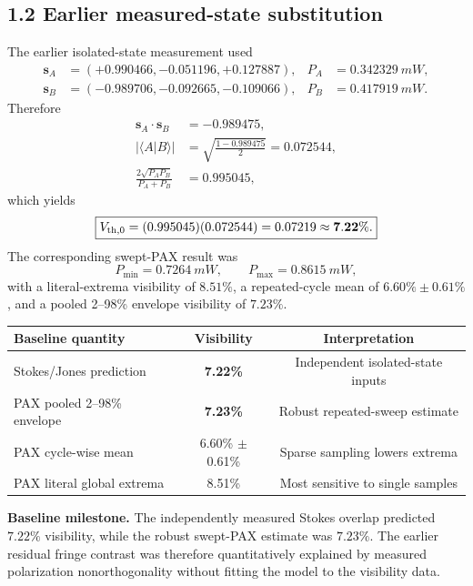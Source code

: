 \documentclass[10pt]{article}
\newcommand{\vect}[1]{\bm{#1}}
\begin{document}
\subsection*{1.2 Earlier measured-state substitution}
The earlier isolated-state measurement used
\begin{align*}
\vect{s}_A&=(+0.990466,-0.051196,+0.127887), & P_A&=\SI{0.342329}{mW},\\
\vect{s}_B&=(-0.989706,-0.092665,-0.109066), & P_B&=\SI{0.417919}{mW}.
\end{align*}
Therefore
\begin{align*}
\vect{s}_A\cdot\vect{s}_B&=-0.989475,\\
\left|\langle A\vert B\rangle\right|&=\sqrt{\frac{1-0.989475}{2}}=0.072544,\\
\frac{2\sqrt{P_AP_B}}{P_A+P_B}&=0.995045,
\end{align*}
which yields
\begin{equation}
\boxed{V_{\rm th,0}=(0.995045)(0.072544)=0.07219\approx\mathbf{7.22\%}.}
\end{equation}
The corresponding swept-PAX result was
\[
P_{\min}=\SI{0.7264}{mW},\qquad P_{\max}=\SI{0.8615}{mW},
\]
with a literal-extrema visibility of $8.51\%$, a repeated-cycle mean of $6.60\%\pm0.61\%$, and a pooled 2--98\% envelope visibility of $7.23\%$.

\begin{center}
\begin{tabular}{lcc}
\toprule
Baseline quantity & Visibility & Interpretation \\
\midrule
Stokes/Jones prediction & \textbf{7.22\%} & Independent isolated-state inputs \\
PAX pooled 2--98\% envelope & \textbf{7.23\%} & Robust repeated-sweep estimate \\
PAX cycle-wise mean & 6.60\% $\pm$ 0.61\% & Sparse sampling lowers extrema \\
PAX literal global extrema & 8.51\% & Most sensitive to single samples \\
\bottomrule
\end{tabular}
\end{center}

\begin{tcolorbox}[colback=light,colframe=navy,boxrule=0.6pt,arc=1.5pt,left=6pt,right=6pt,top=5pt,bottom=5pt]
\textbf{Baseline milestone.} The independently measured Stokes overlap predicted $7.22\%$ visibility, while the robust swept-PAX estimate was $7.23\%$. The earlier residual fringe contrast was therefore quantitatively explained by measured polarization nonorthogonality without fitting the model to the visibility data.
\end{tcolorbox}
\end{document}

